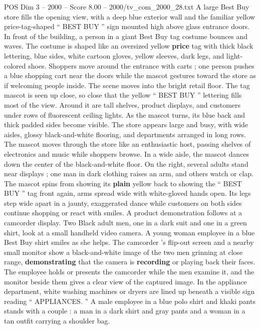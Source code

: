 \begin{textsample}{POS Dim 3 – 2000 – Score 8.00 – 2000/tv\_com\_2000\_28.txt}  \label{ex:f3_pos_061}
A large Best Buy store fills the opening view, with a deep blue exterior wall and the familiar yellow price-tag-shaped “ BEST BUY ” sign mounted high above glass entrance doors.
In front of the building, a person in a giant Best Buy tag costume bounces and waves.
The costume is shaped like an oversized yellow \textbf{price} tag with thick black lettering, blue sides, white cartoon gloves, yellow sleeves, dark legs, and light-colored shoes.
Shoppers move around the entrance with carts ; one person pushes a blue shopping cart near the doors while the mascot gestures toward the store as if welcoming people inside.
The scene moves into the bright retail floor.
The tag mascot is seen up close, so close that the yellow “ BEST BUY ” lettering fills most of the view.
Around it are tall shelves, product displays, and customers under rows of fluorescent ceiling lights.
As the mascot turns, its blue back and thick padded sides become visible.
The store appears large and busy, with wide aisles, glossy black-and-white flooring, and departments arranged in long rows.
The mascot moves through the store like an enthusiastic host, passing shelves of electronics and music while shoppers browse.
In a wide aisle, the mascot dances down the center of the black-and-white floor.
On the right, several adults stand near displays ; one man in dark clothing raises an arm, and others watch or clap.
The mascot spins from showing its \textbf{plain} yellow back to showing the “ BEST BUY ” tag front again, arms spread wide with white-gloved hands open.
Its legs step wide apart in a jaunty, exaggerated dance while customers on both sides continue shopping or react with smiles.
A product demonstration follows at a camcorder display.
Two Black adult men, one in a dark suit and one in a green shirt, look at a small handheld video camera.
A young woman employee in a blue Best Buy shirt smiles as she helps.
The camcorder ’s flip-out screen and a nearby small monitor show a black-and-white image of the two men grinning at close range, \textbf{demonstrating} that the camera is \textbf{recording} or playing back their faces.
The employee holds or presents the camcorder while the men examine it, and the monitor beside them gives a clear view of the captured image.
In the appliance department, white washing machines or dryers are lined up beneath a visible sign reading “ APPLIANCES. ” A male employee in a blue polo shirt and khaki pants stands with a couple : a man in a dark shirt and gray pants and a woman in a tan outfit carrying a shoulder bag.

\end{textsample}

